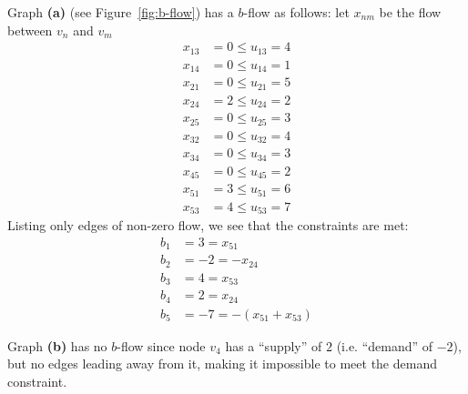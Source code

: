 Graph \textbf{(a)} (see Figure~\ref{fig:b-flow})  has a $b$-flow as follows: let $x_{nm}$ be the flow between $v_n$ and $v_m$
\begingroup
\newcommand\edgeval[4]{x_{#1 #2} &= #4 \le u_{#1 #2} = #3}
\begin{align*}
  \edgeval 1 3 4 0 \\
  \edgeval 1 4 1 0 \\
  \edgeval 2 1 5 0 \\
  \edgeval 2 4 2 2 \\
  \edgeval 2 5 3 0 \\
  \edgeval 3 2 4 0 \\
  \edgeval 3 4 3 0 \\
  \edgeval 4 5 2 0 \\
  \edgeval 5 1 6 3 \\
  \edgeval 5 3 7 4
\end{align*}
\endgroup
Listing only edges of non-zero flow, we see that the constraints are met:
\begin{align*}
  b_1 &= 3 = x_{51} \\
  b_2 &= -2 = -x_{24} \\
  b_3 &= 4 = x_{53} \\
  b_4 &= 2 = x_{24} \\
  b_5 &= -7 = -(x_{51} + x_{53})
\end{align*}

Graph \textbf{(b)} has no $b$-flow since node $v_4$ has a ``supply'' of $2$ (i.e. ``demand'' of $-2$), but 
no edges leading away from it, making it impossible to meet the demand constraint.
